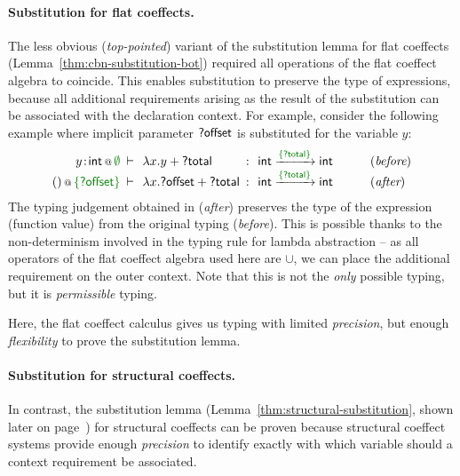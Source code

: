 \paragraph{Substitution for flat coeffects.} 
The less obvious (\emph{top-pointed}) variant of the substitution lemma for flat coeffects 
(Lemma~\ref{thm:cbn-substitution-bot}) required all operations of the flat coeffect algebra
to coincide. This enables substitution to preserve the type of expressions, because all
additional requirements arising as the result of the substitution can be associated with the
declaration context. For example, consider the following example where implicit parameter 
$\textnormal{\sffamily ?offset}$ is substituted for the variable $y$:
%
\begin{equation*}
\begin{array}{rclcll}
 \coctx{y\!:\!\ident{int}}{\cclrd{\emptyset}} &\narrow{\vdash}& \lambda x.y + \ident{?total} &\narrow{:}&
   \ident{int} \xrightarrow{\cclrd{ \{ \ident{?total} \} }} \ident{int} & \qquad(\textit{before}) \\
\coctx{()}{\cclrd{ \{ \ident{?offset} \} }} &\narrow{\vdash}& \lambda x.\ident{?offset} + \ident{?total} &\narrow{:}&
  \ident{int} \xrightarrow{\cclrd{ \{ \ident{?total} \} }} \ident{int} & \qquad(\textit{after})
\end{array}  
\end{equation*}
%
The typing judgement obtained in (\emph{after}) preserves the type of the expression (function 
value) from the original typing (\emph{before}). This is possible thanks to the non-determinism 
involved in the typing rule for lambda abstraction -- as all operators of the flat coeffect 
algebra used here are $\cup$, we can place the additional requirement on the outer context. 
Note that this is not the \emph{only} possible typing, but it is \emph{permissible} typing.

Here, the flat coeffect calculus gives us typing with limited \emph{precision}, but 
enough \emph{flexibility} to prove the substitution lemma.

\paragraph{Substitution for structural coeffects.}
In contrast, the substitution lemma (Lemma~\ref{thm:structural-substitution}, shown later on 
page~\pageref{thm:structural-substitution}) for structural coeffects can be proven because 
structural coeffect systems provide enough \emph{precision} to identify exactly with which 
variable should a context requirement be associated.

